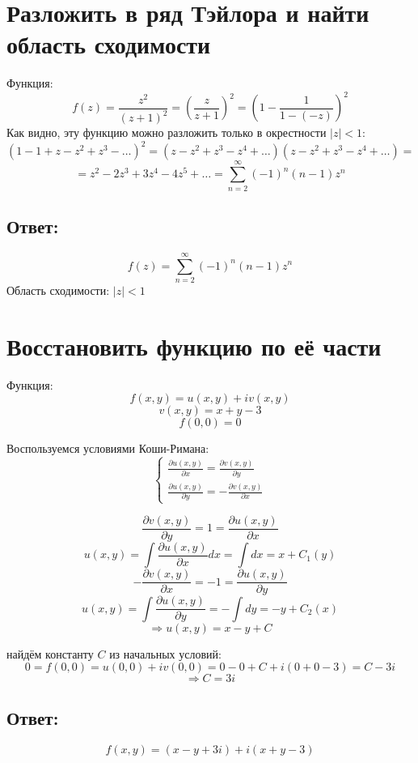 \documentclass[12pt]{scrartcl}
\begin{document}
\section{Разложить в ряд Тэйлора и найти область сходимости}
Функция:
$$f\left(z\right) = \frac{z^2}{\left(z+1\right)^2} = \left(\frac{z}{z+1}\right)^2 = \left(1 - \frac{1}{1-\left(-z\right)}\right)^2$$
Как видно, эту функцию можно разложить только в окрестности $\left|z\right| < 1$:
$$\left(1-1+z-z^2+z^3-\dots\right)^2 = \left(z-z^2+z^3-z^4+\dots\right)\left(z-z^2+z^3-z^4+\dots\right) =$$
$$= z^2 - 2z^3 + 3z^4 - 4z^5 + \dots = \sum\limits_{n=2}^{\infty}\left(-1\right)^n\left(n-1\right)z^n$$
\subsection*{Ответ:}
$$f\left(z\right)=\sum\limits_{n=2}^{\infty}\left(-1\right)^n\left(n-1\right)z^n$$
Область сходимости: $\left|z\right|<1$
\newpage
\section{Восстановить функцию по её части}
Функция:
$$f\left(x,y\right) = u\left(x,y\right) + iv\left(x,y\right)$$
$$v\left(x,y\right) = x + y - 3$$
$$f\left(0, 0\right) = 0$$

Воспользуемся условиями Коши-Римана:
$$
\begin{cases}
\frac{\partial u\left(x,y\right)}{\partial x} = \frac{\partial v\left(x,y\right)}{\partial y}\\
\frac{\partial u\left(x,y\right)}{\partial y} = -\frac{\partial v\left(x,y\right)}{\partial x}
\end{cases}
$$

$$\frac{\partial v\left(x,y\right)}{\partial y} = 1 = \frac{\partial u\left(x,y\right)}{\partial x}$$
$$u\left(x,y\right) = \int\frac{\partial u\left(x,y\right)}{\partial x}dx = \int dx = x + C_1\left(y\right)$$
$$-\frac{\partial v\left(x,y\right)}{\partial x} = -1 = \frac{\partial u\left(x,y\right)}{\partial y}$$
$$u\left(x,y\right) = \int\frac{\partial u\left(x,y\right)}{\partial y} = -\int dy = -y + C_2\left(x\right)$$
$$\Rightarrow u\left(x,y\right) = x - y + C$$

найдём константу $C$ из начальных условий:
$$0 = f\left(0,0\right) = u\left(0,0\right) + i v\left(0,0\right) = 0 - 0 + C + i\left(0 + 0 - 3\right) = C - 3i$$
$$\Rightarrow C = 3i$$
\subsection*{Ответ:}
$$f\left(x,y\right) = \left(x - y + 3i\right) + i\left(x + y - 3\right)$$
\newpage
\end{document}
